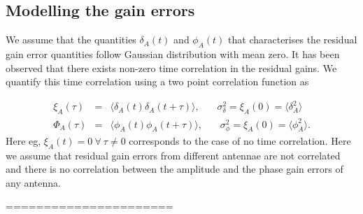 \documentclass[fleqn,usenatbib]{mnras}
\begin{document}
\subsection{Modelling the gain errors}
We assume that the quantities $\delta_A(t)$ and $\phi_A(t)$ that characterises the residual gain error  quantities follow Gaussian distribution with mean zero. It has been observed that there exists non-zero time correlation in the residual gains. We quantify this time correlation using a two point correlation function as 

\begin{eqnarray}
\xi_{A}(\tau) &=& \langle \delta_A(t) \delta_A(t+\tau)\rangle,\ \ \ \ \ \ \ \  \sigma_{\delta}^2 =  \xi_A(0) =  \langle \delta_A^2 \rangle \\ \nonumber
\Phi_{A}(\tau) &=& \langle \phi_A(t) \phi_A(t+\tau)\rangle,\ \ \ \ \ \ \ \  \sigma_{\phi}^2 =  \xi_A(0) =  \langle \phi_A^2 \rangle.
\end{eqnarray}
Here  eg, $\xi_A (t) = 0\  \forall\  \tau \neq 0$ corresponds to the case of no time correlation. Here we assume that residual gain errors from different antennae are not correlated and  there is no correlation between the amplitude and the phase gain errors of any  antenna. 


======================
\end{document}
